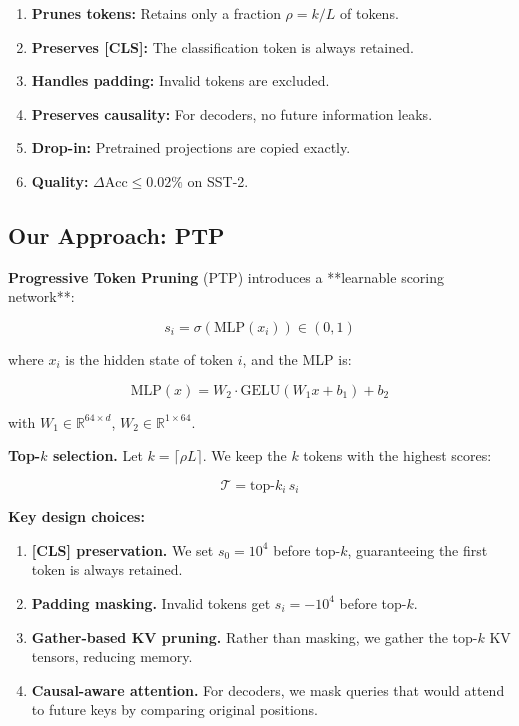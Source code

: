 \begin{enumerate}
\item \textbf{Prunes tokens:} Retains only a fraction $\rho = k/L$ of tokens.
\item \textbf{Preserves [CLS]:} The classification token is always retained.
\item \textbf{Handles padding:} Invalid tokens are excluded.
\item \textbf{Preserves causality:} For decoders, no future information leaks.
\item \textbf{Drop-in:} Pretrained projections are copied exactly.
\item \textbf{Quality:} $\Delta\text{Acc} \leq 0.02\%$ on SST-2.

\end{enumerate}
\subsection{Our Approach: PTP}

\textbf{Progressive Token Pruning} (PTP) introduces a **learnable scoring 
network**:

\[
s_i = \sigma\left(\text{MLP}(x_i)\right) \in (0, 1)
\tag{1.1}
\]

where $x_i$ is the hidden state of token $i$, and the MLP is:

\[
\text{MLP}(x) = W_2 \cdot \text{GELU}(W_1 x + b_1) + b_2
\tag{1.2}
\]

with $W_1 \in \mathbb{R}^{64 \times d}$, $W_2 \in \mathbb{R}^{1 \times 64}$.

\textbf{Top-$k$ selection.} Let $k = \lceil \rho L \rceil$. We keep the $k$ 
tokens with the highest scores:

\[
\mathcal{T} = \text{top-}k_i \, s_i
\tag{1.3}
\]

\textbf{Key design choices:}

\begin{enumerate}
\item \textbf{[CLS] preservation.} We set $s_0 = 10^4$ before top-$k$, guaranteeing
  the first token is always retained.
\item \textbf{Padding masking.} Invalid tokens get $s_i = -10^4$ before top-$k$.
\item \textbf{Gather-based KV pruning.} Rather than masking, we gather the top-$k$
  KV tensors, reducing memory.
\item \textbf{Causal-aware attention.} For decoders, we mask queries that would
  attend to future keys by comparing original positions.

\end{enumerate}
